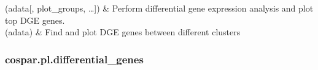 \documentclass[letterpaper,10pt,english]{sphinxmanual}
\begin{document}
\begin{savenotes}\sphinxatlongtablestart\begin{longtable}[c]{}
\hline

\endfirsthead

%
{}\\
\hline

\endhead

\hline
{}\\
\endfoot

\endlastfoot

{\hyperref[\detokenize{cospar.pl.differential_genes:cospar.pl.differential_genes}]{}}(adata{[}, plot\_groups, …{]})
&
Perform differential gene expression analysis and plot top DGE genes.
\\
\hline
{\hyperref[\detokenize{cospar.pl.differential_genes_for_given_fates:cospar.pl.differential_genes_for_given_fates}]{}}(adata)
&
Find and plot DGE genes between different clusters
\\
\hline
\end{longtable}\sphinxatlongtableend\end{savenotes}


\subsubsection{cospar.pl.differential\_genes}
\label{\detokenize{cospar.pl.differential_genes:cospar-pl-differential-genes}}\label{\detokenize{cospar.pl.differential_genes::doc}}
\end{document}
